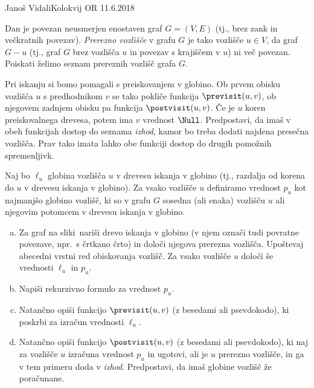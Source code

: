 \begin{naloga}{Janoš Vidali}{Kolokvij OR 11.6.2018}
\begin{vprasanje}
Dan je povezan neusmerjen enostaven graf $G = (V, E)$
(tj., brez zank in večkratnih povezav).
{\em Prerezno vozlišče} v grafu $G$ je tako vozlišče $u \in V$,
da graf $G - u$
(tj., graf $G$ brez vozlišča $u$ in povezav s krajiščem v $u$)
ni več povezan.
Poiskati želimo seznam prereznih vozlišč grafa $G$.

Pri iskanju si bomo pomagali s preiskovanjem v globino.
Ob prvem obisku vozlišča $u$ s predhodnikom $v$
se tako pokliče funkcija $\previsit(u, v)$,
ob njegovem zadnjem obisku pa funkcija $\postvisit(u, v)$.
Če je $u$ koren preiskovalnega drevesa, potem ima $v$ vrednost $\Null$.
Predpostavi, da imaš v obeh funkcijah dostop do seznama {\sl izhod},
kamor bo treba dodati najdena presečna vozlišča.
Prav tako imata lahko obe funkciji dostop do drugih pomožnih spremenljivk.

Naj bo $\ell_u$ globina vozlišča $u$ v drevesu iskanja v globino
(tj., razdalja od korena do $u$ v drevesu iskanja v globino).
Za vsako vozlišče $u$ definiramo vrednost $p_u$ kot najmanjšo globino vozlišč,
ki so v grafu $G$ sosedna (ali enaka) vozlišču $u$
ali njegovim potomcem v drevesu iskanja v globino.

\begin{enumerate}[(a)]
\item Za graf na sliki~\fig nariši drevo iskanja v globino
(v njem označi tudi povratne povezave, npr.~s črtkano črto)
in določi njegova prerezna vozlišča.
Upoštevaj abecedni vrstni red obiskovanja vozlišč.
Za vsako vozlišče $u$ določi še vrednosti $\ell_u$ in $p_u$.

\item Napiši rekurzivno formulo za vrednost $p_u$.

\item Natančno opiši funkcijo $\previsit(u, v)$
(z besedami ali psevdokodo),
ki poskrbi za izračun vrednosti $\ell_u$.

\item Natančno opiši funkcijo $\postvisit(u, v)$
(z besedami ali psevdokodo),
ki naj za vozlišče $u$ izračuna vrednost $p_u$ in ugotovi,
ali je $u$ prerezno vozlišče, in ga v tem primeru doda v {\sl izhod}.
Predpostavi, da imaš globine vozlišč že poračunane.


\end{enumerate}
\end{vprasanje}
\end{naloga}
